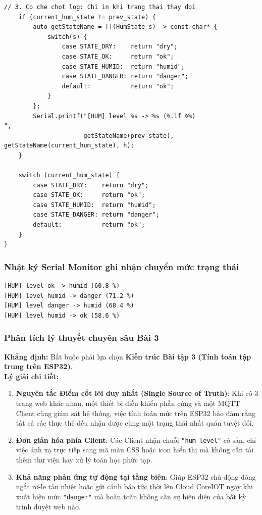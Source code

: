 \begin{lstlisting}[caption={Hàm humLevel() tích hợp Hysteresis 1\% và chốt log thay đổi trạng thái}]
    // 3. Co che chot log: Chi in khi trang thai thay doi
    if (current_hum_state != prev_state) {
        auto getStateName = [](HumState s) -> const char* {
            switch(s) {
                case STATE_DRY:    return "dry";
                case STATE_OK:     return "ok";
                case STATE_HUMID:  return "humid";
                case STATE_DANGER: return "danger";
                default:           return "ok";
            }
        };
        Serial.printf("[HUM] level %s -> %s (%.1f %%)
", 
                      getStateName(prev_state), getStateName(current_hum_state), h);
    }

    switch (current_hum_state) {
        case STATE_DRY:    return "dry";
        case STATE_OK:     return "ok";
        case STATE_HUMID:  return "humid";
        case STATE_DANGER: return "danger";
        default:           return "ok";
    }
}
\end{lstlisting}

\subsubsection{Nhật ký Serial Monitor ghi nhận chuyển mức trạng thái}
\begin{lstlisting}[language={}]
[HUM] level ok -> humid (60.8 %)
[HUM] level humid -> danger (71.2 %)
[HUM] level danger -> humid (68.4 %)
[HUM] level humid -> ok (58.6 %)
\end{lstlisting}

\subsubsection{Phân tích lý thuyết chuyên sâu Bài 3}
\begin{tcolorbox}[colback=blue!5,colframe=blue!75!black,title=\textbf{So sánh lựa chọn kiến trúc: Bài 2 hay Bài 3 cho hệ sinh thái đa Client và MQTT?}]
\textbf{Khẳng định:} Bắt buộc phải lựa chọn \textbf{Kiến trúc Bài tập 3 (Tính toán tập trung trên ESP32)}. \\
\textbf{Lý giải chi tiết:}
\begin{enumerate}
    \item \textbf{Nguyên tắc Điểm cốt lõi duy nhất (Single Source of Truth)}: Khi có 3 trang web khác nhau, một thiết bị điều khiển phần cứng và một MQTT Client cùng giám sát hệ thống, việc tính toán mức trên ESP32 bảo đảm rằng tất cả các thực thể đều nhận được cùng một trạng thái nhất quán tuyệt đối.
    \item \textbf{Đơn giản hóa phía Client}: Các Client nhận chuỗi \texttt{"hum\_level"} có sẵn, chỉ việc ánh xạ trực tiếp sang mã màu CSS hoặc icon hiển thị mà không cần tải thêm thư viện hay xử lý toán học phức tạp.
    \item \textbf{Khả năng phản ứng tự động tại tầng biên}: Giúp ESP32 chủ động đóng ngắt rơ-le tản nhiệt hoặc gửi cảnh báo tức thời lên Cloud CoreIOT ngay khi xuất hiện mức \texttt{"danger"} mà hoàn toàn không cần sự hiện diện của bất kỳ trình duyệt web nào.
\end{enumerate}
\end{tcolorbox}

